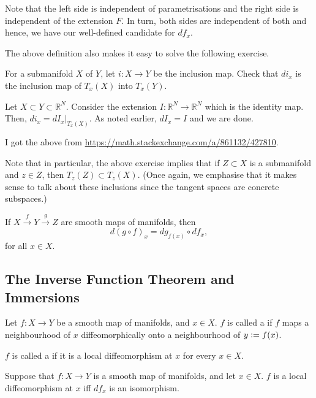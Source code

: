 Note that the left side is independent of parametrisations and the right side is independent of the extension $F$. In turn, both sides are independent of both and hence, we have our well-defined candidate for $df_{x}$. 

The above definition also makes it easy to solve the following exercise. 

\begin{exe}
	For a submanifold $X$ of $Y$, let $i : X \to Y$ be the inclusion map. Check that $di_{x}$ is the inclusion map of $T_{x}(X)$ into $T_{x}(Y)$.
\end{exe}
\begin{soln} 
	Let $X \subset Y \subset \mathbb{R}^{N}$. Consider the extension $I : \mathbb{R}^{N} \to \mathbb{R}^{N}$ which is the identity map. Then, $di_{x} = dI_{x}|_{T_{x}(X)}$. As noted earlier, $dI_{x} = I$ and we are done.
\end{soln}
I got the above from \url{https://math.stackexchange.com/a/861132/427810}.

Note that in particular, the above exercise implies that if $Z \subset X$ is a submanifold and $z \in Z$, then $T_{z}(Z) \subset T_{z}(X)$. (Once again, we emphasise that it makes sense to talk about these inclusions since the tangent spaces are concrete subspaces.)

\begin{thm}
	If $X \xrightarrow{f} Y \xrightarrow{g} Z$ are smooth maps of manifolds, then
	\begin{equation*} 
		d(g \circ f)_{x} = dg_{f(x)} \circ df_{x},
	\end{equation*}
	for all $x \in X$.
\end{thm}

\subsection{The Inverse Function Theorem and Immersions}

\begin{defn}
	Let $f : X \to Y$ be a smooth map of manifolds, and $x \in X$. $f$ is called a  if $f$ maps a neighbourhood of $x$ diffeomorphically onto a neighbourhood of $y \vcentcolon= f(x)$.

	$f$ is called a  if it is a local diffeomorphism at $x$ for every $x \in X$.
\end{defn}

\begin{thm}
	Suppose that $f : X \to Y$ is a smooth map of manifolds, and let $x \in X$. \newline
	$f$ is a local diffeomorphism at $x$ iff $df_{x}$ is an isomorphism.
\end{thm}

